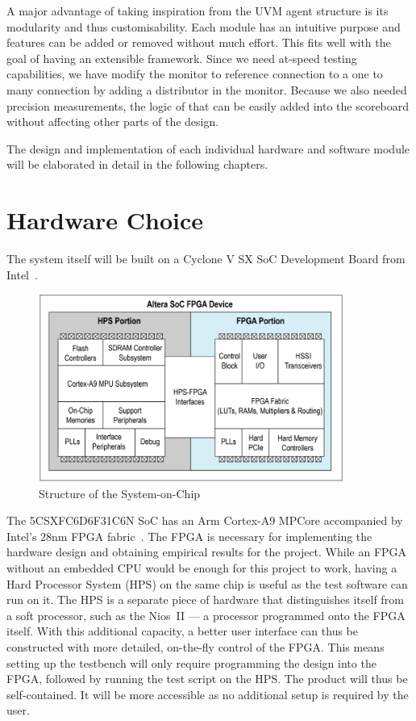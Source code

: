 A major advantage of taking inspiration from the UVM agent structure is its modularity and thus customisability.
Each module has an intuitive purpose and features can be added or removed without much effort.
This fits well with the goal of having an extensible framework.
Since we need at-speed testing capabilities, we have modify the monitor to reference connection to a one to many connection by adding a distributor in the monitor.
Because we also needed precision measurements, the logic of that can be easily added into the scoreboard without affecting other parts of the design.

The design and implementation of each individual hardware and software module will be elaborated in detail in the following chapters.

\section{Hardware Choice}
The system itself will be built on a Cyclone V SX SoC Development Board from Intel~\cite{Intel1}.

\begin{figure}[H]
  \centering
  \includegraphics[width=10cm]{img/SoCStructure}
  \caption{Structure of the System-on-Chip}
  \label{SoCStructure}
\end{figure}

The 5CSXFC6D6F31C6N SoC has an Arm Cortex-A9 MPCore accompanied by Intel's 28nm FPGA fabric~\cite{Altera1}.
The FPGA is necessary for implementing the hardware design and obtaining empirical results for the project.
While an FPGA without an embedded CPU would be enough for this project to work, having a Hard Processor System (HPS) on the same chip is useful as the test software can run on it.
The HPS is a separate piece of hardware that distinguishes itself from a soft processor, such as the Nios~II --- a processor programmed onto the FPGA itself.
With this additional capacity, a better user interface can thus be constructed with more detailed, on-the-fly control of the FPGA.
This means setting up the testbench will only require programming the design into the FPGA, followed by running the test script on the HPS.
The product will thus be self-contained.
It will be more accessible as no additional setup is required by the user.

